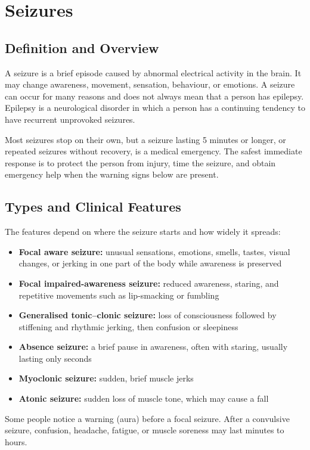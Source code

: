 \chapter{Seizures}

\section*{Definition and Overview}
A seizure is a brief episode caused by abnormal electrical activity in the brain. It may change awareness, movement, sensation, behaviour, or emotions. A seizure can occur for many reasons and does not always mean that a person has epilepsy. Epilepsy is a neurological disorder in which a person has a continuing tendency to have recurrent unprovoked seizures.

Most seizures stop on their own, but a seizure lasting 5 minutes or longer, or repeated seizures without recovery, is a medical emergency. The safest immediate response is to protect the person from injury, time the seizure, and obtain emergency help when the warning signs below are present.

\section*{Types and Clinical Features}
The features depend on where the seizure starts and how widely it spreads:
\begin{itemize}
    \item \textbf{Focal aware seizure:} unusual sensations, emotions, smells, tastes, visual changes, or jerking in one part of the body while awareness is preserved
    \item \textbf{Focal impaired-awareness seizure:} reduced awareness, staring, and repetitive movements such as lip-smacking or fumbling
    \item \textbf{Generalised tonic--clonic seizure:} loss of consciousness followed by stiffening and rhythmic jerking, then confusion or sleepiness
    \item \textbf{Absence seizure:} a brief pause in awareness, often with staring, usually lasting only seconds
    \item \textbf{Myoclonic seizure:} sudden, brief muscle jerks
    \item \textbf{Atonic seizure:} sudden loss of muscle tone, which may cause a fall
\end{itemize}
Some people notice a warning (aura) before a focal seizure. After a convulsive seizure, confusion, headache, fatigue, or muscle soreness may last minutes to hours.

